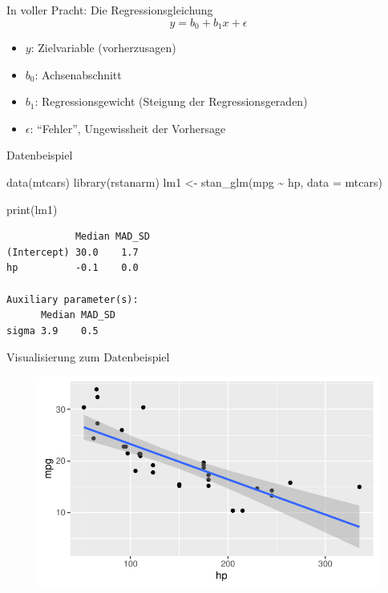 \documentclass[
  ngerman,
  ignorenonframetext,
]{beamer}
\newenvironment{Shaded}{\begin{snugshade}}{\end{snugshade}}
\newcommand{\AttributeTok}[1]{\textcolor[rgb]{0.77,0.63,0.00}{#1}}
\newcommand{\FunctionTok}[1]{\textcolor[rgb]{0.00,0.00,0.00}{#1}}
\newcommand{\NormalTok}[1]{#1}
\newcommand{\OtherTok}[1]{\textcolor[rgb]{0.56,0.35,0.01}{#1}}
\newcommand{\SpecialCharTok}[1]{\textcolor[rgb]{0.00,0.00,0.00}{#1}}
\providecommand{\tightlist}{%
  \setlength{\itemsep}{0pt}\setlength{\parskip}{0pt}}
\begin{document}
\begin{frame}{In voller Pracht: Die Regressionsgleichung}
\protect\hypertarget{in-voller-pracht-die-regressionsgleichung}{}
\[y = b_0 + b_1x + \epsilon\]

\begin{itemize}
\tightlist
\item
  \(y\): Zielvariable (vorherzusagen)
\item
  \(b_0\): Achsenabschnitt
\item
  \(b_1\): Regressionsgewicht (Steigung der Regressionsgeraden)
\item
  \(\epsilon\): ``Fehler'', Ungewissheit der Vorhersage
\end{itemize}
\end{frame}

\begin{frame}[fragile]{Datenbeispiel}
\protect\hypertarget{datenbeispiel}{}
\begin{Shaded}
\begin{Highlighting}[]
\FunctionTok{data}\NormalTok{(mtcars)}
\FunctionTok{library}\NormalTok{(rstanarm)}
\NormalTok{lm1 }\OtherTok{\textless{}{-}} \FunctionTok{stan\_glm}\NormalTok{(mpg }\SpecialCharTok{\textasciitilde{}}\NormalTok{ hp, }\AttributeTok{data =}\NormalTok{ mtcars)}
\end{Highlighting}
\end{Shaded}

\begin{Shaded}
\begin{Highlighting}[]
\FunctionTok{print}\NormalTok{(lm1)}
\end{Highlighting}
\end{Shaded}

\begin{verbatim}
            Median MAD_SD
(Intercept) 30.0    1.7  
hp          -0.1    0.0  

Auxiliary parameter(s):
      Median MAD_SD
sigma 3.9    0.5   
\end{verbatim}
\end{frame}

\begin{frame}{Visualisierung zum Datenbeispiel}
\protect\hypertarget{visualisierung-zum-datenbeispiel}{}
\begin{figure}[H]
\includegraphics[width=0.7\linewidth]{unnamed-chunk-11-1} \end{figure}
\end{frame}
\end{document}
